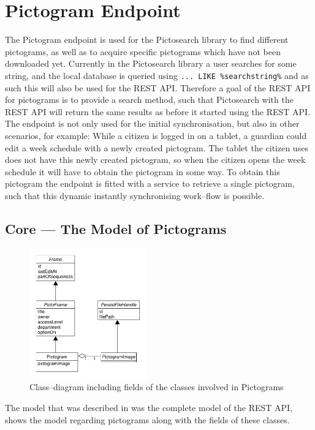 \section{Pictogram Endpoint}\label{sec:pictogramendpoint}
\begin{center}
\end{center}

The Pictogram endpoint is used for the Pictosearch library to find different pictograms, as well as to acquire specific pictograms which have not been downloaded yet.
Currently in the Pictosearch library a user searches for some string, and the local database is queried using \texttt{... LIKE \%searchstring\%} and as such this will also be used for the REST API.
Therefore a goal of the REST API for pictograms is to provide a search method, such that Pictosearch with the REST API will return the same results as before it started using the REST API.
The endpoint is not only used for the initial synchronisation, but also in other scenarios, for example:
While a citizen is logged in on a tablet, a guardian could edit a week schedule with a newly created pictogram.
The tablet the citizen uses does not have this newly created pictogram, so when the citizen opens the week schedule it will have to obtain the pictogram in some way.
To obtain this pictogram the endpoint is fitted with a service to retrieve a single pictogram, such that this dynamic instantly synchronising work--flow is possible.

\subsection{Core --- The Model of Pictograms}\label{subsec:pictomodel}   
\begin{figure}
    \centering
    \includegraphics[width=0.45\textwidth]{figures/pictogrammodel.pdf}
    \caption{Class--diagram including fields of the classes involved in Pictograms}\label{fig:pictogramModel}
\end{figure} 
The model that was described in  was the complete model of the REST API,  shows the model regarding pictograms along with the fields of these classes.

